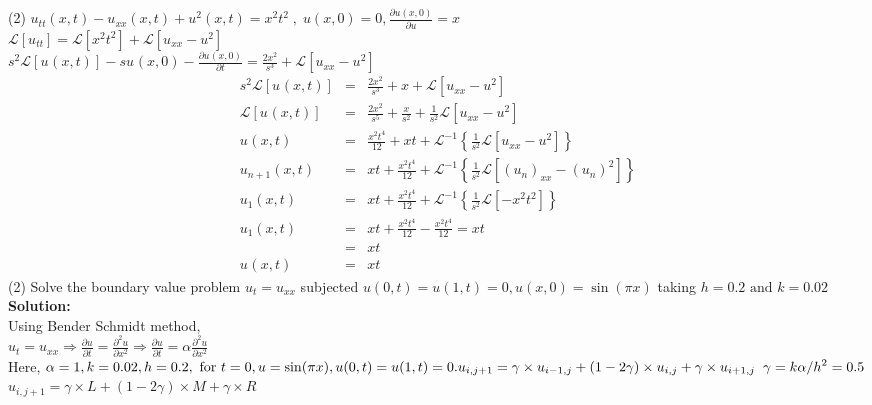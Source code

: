 \documentclass[12pt]{report}
\newcommand{\Laplace}{\mathcal{L}}
\newcommand{\Un}[2]{u_{#1}(#2)}
\newcommand{\NI}{\noindent}
\newcommand{\LT}[1]{\Laplace \left[#1\right]}
\newcommand{\Unx}[1]{\Un{#1}{x,t}}
\newcommand{\InverseLx}[1]{\Laplace^{-1}\left\{ #1 \right\}}
\newcommand{\Usub}[1]{u_{#1}}
\newcommand{\Usup}[1]{u^{#1}}
\begin{document}
\NI (2) $\displaystyle\Unx{tt} - \Unx{xx} + u^{2}(x,t) = x^2t^2 \; , \; u(x,0) = 0, \frac{\partial u(x,0)}{\partial u} = x 
$\\[0.4cm]
$\displaystyle
 \LT{u_{tt}} = \LT{x^2t^2} + \LT{u_{xx} - u^2}
$\\[0.2cm]
$\displaystyle
s^2 \LT{\Unx{}} - s\Un{}{x,0} - \frac{\partial \Un{}{x,0}}{\partial t} = \frac{2x^2}{s^3} + \LT{\Usub{xx} - \Usup{2}}
$\\[0.2cm]

\begin{eqnarray*}
s^2 \LT{\Un{}{x,t}} &=& \frac{2x^2}{s^3} + x + \LT{\Usub{xx} - \Usup{2}} \\
\LT{\Un{}{x,t}} &=& \frac{2x^2}{s^5} + \frac{x}{s^2} + \frac{1}{s^2}\LT{\Usub{xx} - \Usup{2}} \\
\Un{}{x,t} &=& \frac{x^2t^4}{12} + xt + \InverseLx{\frac{1}{s^2}\LT{\Usub{xx} - \Usup{2}}} \\
\Unx{n+1} &=& xt + \frac{x^2t^4}{12} + \InverseLx{\frac{1}{s^2}\LT{(\Usub{n})_{xx} - (\Usub{n})^2}} \\
\Unx{1} &=& xt + \frac{x^2t^4}{12} + \InverseLx{\frac{1}{s^2}\LT{-x^2t^2}} \\
\Unx{1} &=& xt + \frac{x^2t^4}{12} - \frac{x^2t^4}{12} = xt \\
&=& xt \\
\Un{}{x,t} &=& xt
\end{eqnarray*}
\newpage
(2) Solve the boundary value problem $\displaystyle u_t = u_{xx}$ subjected $\displaystyle u(0,t)= u(1,t)=0, u(x,0) = \sin(\pi x)$ taking $\displaystyle h=0.2 \text{ and } k=0.02$\\[0.4cm]
\textbf{Solution:}\\
Using Bender Schmidt method,\\[0.2cm]
$\displaystyle u_t = u_{xx} \Rightarrow \frac{\partial u}{\partial t} = \frac{\partial^2 u}{\partial x^2} \Rightarrow \frac{\partial u}{\partial t} = \alpha \frac{\partial^2 u}{\partial x^2}$\\[0.3cm]
Here, $\displaystyle \alpha = 1, k = 0.02, h = 0.2, \text{ for } t = 0, u = \sin(\pi x), u(0,t) = u(1,t) = 0. \\
u_{i,j+1} = \gamma \times u_{i-1,j} + (1-2\gamma) \times u_{i,j} + \gamma \times u_{i+1,j} \; \; \gamma = k\alpha/h^2 = 0.5$\\[0.1cm]
$\displaystyle u_{i,j+1} = \gamma \times L + (1-2\gamma)\times M + \gamma \times R$\\[0.6cm]
\end{document}
